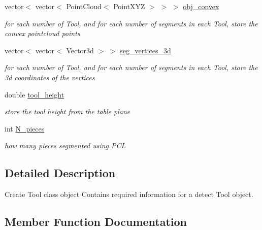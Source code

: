 \begin{DoxyCompactItemize}
vector$<$ vector$<$ Point\+Cloud$<$ Point\+X\+YZ $>$ $>$ $>$ \hyperlink{classCreate__Tool_a3da16d94dd66220185c1adcec47416af}{obj\+\_\+convex}
\begin{DoxyCompactList}\small\item\em for each number of \textquotesingle{}Tool\textquotesingle{}, and for each number of segments in each \textquotesingle{}Tool\textquotesingle{}, store the convex pointcloud points \end{DoxyCompactList}\item 
\mbox{\label{classCreate__Tool_a22058ca58e880ab522b8b7872040d175}} 
vector$<$ vector$<$ Vector3d $>$ $>$ \hyperlink{classCreate__Tool_a22058ca58e880ab522b8b7872040d175}{seg\+\_\+vertices\+\_\+3d}
\begin{DoxyCompactList}\small\item\em for each number of \textquotesingle{}Tool\textquotesingle{}, and for each number of segments in each \textquotesingle{}Tool\textquotesingle{}, store the 3d coordinates of the vertices \end{DoxyCompactList}\item 
\mbox{\label{classCreate__Tool_a6de511d1a128fb0f665c0c70d2caa5f3}} 
double \hyperlink{classCreate__Tool_a6de511d1a128fb0f665c0c70d2caa5f3}{tool\+\_\+height}
\begin{DoxyCompactList}\small\item\em store the tool height from the table plane \end{DoxyCompactList}\item 
\mbox{\label{classCreate__Tool_a59fc2168107cc01207ae6029ddfce8e6}} 
int \hyperlink{classCreate__Tool_a59fc2168107cc01207ae6029ddfce8e6}{N\+\_\+pieces}
\begin{DoxyCompactList}\small\item\em how many pieces segmented using P\+CL \end{DoxyCompactList}\end{DoxyCompactItemize}


\subsection{Detailed Description}
Create Tool class object Contains required information for a detect Tool object. 

\subsection{Member Function Documentation}
\mbox{\label{classCreate__Tool_ac8a58a01a4da4d08ae5603e7fee061d6}} 
